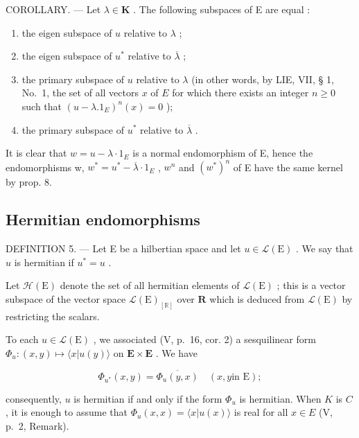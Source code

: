 COROLLARY. --- Let \(\lambda \in \mathbf{K}\) . The following subspaces of E are equal :

\begin{enumerate}
\def\labelenumi{\alph{enumi})}
\item
  the eigen subspace of \(u\) relative to \(\lambda\) ;
\item
  the eigen subspace of \(u^{*}\) relative to \(\overline{\lambda}\) ;
\item
  the primary subspace of \(u\) relative to \(\lambda\) (in other words, by LIE, VII, § 1, No.~1, the set of all vectors \(x\) of \(E\) for which there exists an integer \(n \geqslant 0\) such that \((u - \lambda .1_{E})^{n}(x) = 0\) );
\item
  the primary subspace of \(u^{*}\) relative to \(\overline{\lambda}\) .
\end{enumerate}

It is clear that \(w = u - \lambda \cdot 1_{E}\) is a normal endomorphism of E, hence the endomorphisms w, \(w^{*} = u^{*} - \overline{\lambda} \cdot 1_{E}\) , \(w^{n}\) and \((w^{*})^{n}\) of E have the same kernel by prop. 8.

\subsection{Hermitian endomorphisms}

DEFINITION 5. --- Let E be a hilbertian space and let \(u \in \mathcal{L}(\mathrm{E})\) . We say that \(u\) is hermitian if \(u^* = u\) .

Let \(\mathcal{H}(\mathrm{E})\) denote the set of all hermitian elements of \(\mathcal{L}(\mathrm{E})\) ; this is a vector subspace of the vector space \(\mathcal{L}(\mathrm{E})_{[\mathbb{R}]}\) over \(\mathbf{R}\) which is deduced from \(\mathcal{L}(\mathrm{E})\) by restricting the scalars.

To each \(u \in \mathcal{L}(\mathrm{E})\) , we associated (V, p.~16, cor. 2) a sesquilinear form \(\Phi_u : (x, y) \mapsto \langle x | u(y) \rangle\) on \(\mathbf{E} \times \mathbf{E}\) . We have

\[
\Phi_ {u ^ {*}} (x, y) = \overline {{{{\Phi_ {u} (y , x)}}}} \quad (x, y \text {in E});\tag{14}
\]

consequently, \(u\) is hermitian if and only if the form \(\Phi_u\) is hermitian. When \(K\) is \(C\) , it is enough to assume that \(\Phi_u(x, x) = \langle x | u(x) \rangle\) is real for all \(x \in E\) (V, p.~2, Remark).


